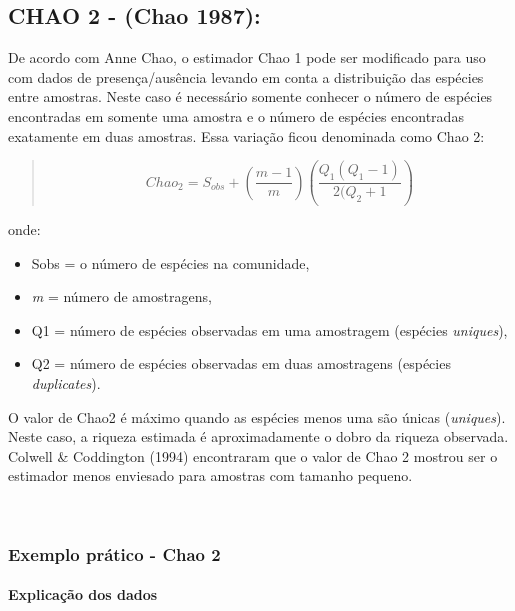 \documentclass[
]{book}
\begin{document}
\hypertarget{chao-2---chao-1987}{%
\subsection{CHAO 2 - (Chao 1987):}\label{chao-2---chao-1987}}

De acordo com Anne Chao, o estimador Chao 1 pode ser modificado para uso com dados de presença/ausência levando em conta a distribuição das espécies entre amostras. Neste caso é
necessário somente conhecer o número de espécies encontradas em somente uma amostra e o
número de espécies encontradas exatamente em duas amostras. Essa variação ficou denominada como
Chao 2:

\begin{quote}
\[Chao_{2} = S_{obs} + \left(\frac{m-1}{m}\right)\left(\frac{Q_1(Q_1-1)}{2(Q_2 + 1}\right)\]
\end{quote}

onde:

\begin{itemize}
\item
  Sobs = o número de espécies na comunidade,
\item
  \emph{m} = número de amostragens,
\item
  Q1 = número de espécies observadas em uma amostragem (espécies \emph{uniques}),
\item
  Q2 = número de espécies observadas em duas amostragens (espécies \emph{duplicates}).
\end{itemize}

O valor de Chao2 é máximo quando as espécies menos uma são únicas (\emph{uniques}). Neste caso, a riqueza estimada é aproximadamente o dobro da riqueza observada. Colwell \& Coddington (1994) encontraram que o valor de Chao 2 mostrou ser o estimador menos enviesado para amostras com tamanho pequeno.

~

\hypertarget{exemplo-pruxe1tico---chao-2}{%
\subsubsection{Exemplo prático - Chao 2}\label{exemplo-pruxe1tico---chao-2}}

\hypertarget{explicauxe7uxe3o-dos-dados-2}{%
\paragraph{Explicação dos dados}\label{explicauxe7uxe3o-dos-dados-2}}
\end{document}
